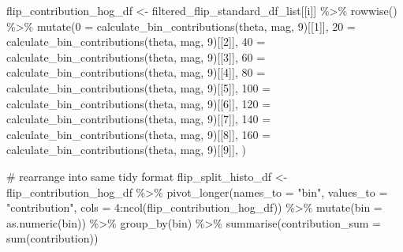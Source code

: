 \documentclass[
  letterpaper,
  DIV=11,
  numbers=noendperiod]{scrreprt}
\newenvironment{Shaded}{\begin{snugshade}}{\end{snugshade}}
\newcommand{\AttributeTok}[1]{\textcolor[rgb]{0.40,0.45,0.13}{#1}}
\newcommand{\CommentTok}[1]{\textcolor[rgb]{0.37,0.37,0.37}{#1}}
\newcommand{\DecValTok}[1]{\textcolor[rgb]{0.68,0.00,0.00}{#1}}
\newcommand{\FunctionTok}[1]{\textcolor[rgb]{0.28,0.35,0.67}{#1}}
\newcommand{\NormalTok}[1]{\textcolor[rgb]{0.00,0.23,0.31}{#1}}
\newcommand{\OtherTok}[1]{\textcolor[rgb]{0.00,0.23,0.31}{#1}}
\newcommand{\SpecialCharTok}[1]{\textcolor[rgb]{0.37,0.37,0.37}{#1}}
\newcommand{\StringTok}[1]{\textcolor[rgb]{0.13,0.47,0.30}{#1}}
\begin{document}
\begin{Shaded}
\begin{Highlighting}[]
\NormalTok{  flip\_contribution\_hog\_df }\OtherTok{\textless{}{-}}
\NormalTok{    filtered\_flip\_standard\_df\_list[[i]] }\SpecialCharTok{\%\textgreater{}\%}
    \FunctionTok{rowwise}\NormalTok{() }\SpecialCharTok{\%\textgreater{}\%}
    \FunctionTok{mutate}\NormalTok{(}\StringTok{\textasciigrave{}}\AttributeTok{0}\StringTok{\textasciigrave{}} \OtherTok{=} \FunctionTok{calculate\_bin\_contributions}\NormalTok{(theta, mag, }\DecValTok{9}\NormalTok{)[[}\DecValTok{1}\NormalTok{]],}
           \StringTok{\textasciigrave{}}\AttributeTok{20}\StringTok{\textasciigrave{}} \OtherTok{=} \FunctionTok{calculate\_bin\_contributions}\NormalTok{(theta, mag, }\DecValTok{9}\NormalTok{)[[}\DecValTok{2}\NormalTok{]],}
           \StringTok{\textasciigrave{}}\AttributeTok{40}\StringTok{\textasciigrave{}} \OtherTok{=} \FunctionTok{calculate\_bin\_contributions}\NormalTok{(theta, mag, }\DecValTok{9}\NormalTok{)[[}\DecValTok{3}\NormalTok{]],}
           \StringTok{\textasciigrave{}}\AttributeTok{60}\StringTok{\textasciigrave{}} \OtherTok{=} \FunctionTok{calculate\_bin\_contributions}\NormalTok{(theta, mag, }\DecValTok{9}\NormalTok{)[[}\DecValTok{4}\NormalTok{]],}
           \StringTok{\textasciigrave{}}\AttributeTok{80}\StringTok{\textasciigrave{}} \OtherTok{=} \FunctionTok{calculate\_bin\_contributions}\NormalTok{(theta, mag, }\DecValTok{9}\NormalTok{)[[}\DecValTok{5}\NormalTok{]],}
           \StringTok{\textasciigrave{}}\AttributeTok{100}\StringTok{\textasciigrave{}} \OtherTok{=} \FunctionTok{calculate\_bin\_contributions}\NormalTok{(theta, mag, }\DecValTok{9}\NormalTok{)[[}\DecValTok{6}\NormalTok{]],}
           \StringTok{\textasciigrave{}}\AttributeTok{120}\StringTok{\textasciigrave{}} \OtherTok{=} \FunctionTok{calculate\_bin\_contributions}\NormalTok{(theta, mag, }\DecValTok{9}\NormalTok{)[[}\DecValTok{7}\NormalTok{]],}
           \StringTok{\textasciigrave{}}\AttributeTok{140}\StringTok{\textasciigrave{}} \OtherTok{=} \FunctionTok{calculate\_bin\_contributions}\NormalTok{(theta, mag, }\DecValTok{9}\NormalTok{)[[}\DecValTok{8}\NormalTok{]],}
           \StringTok{\textasciigrave{}}\AttributeTok{160}\StringTok{\textasciigrave{}} \OtherTok{=} \FunctionTok{calculate\_bin\_contributions}\NormalTok{(theta, mag, }\DecValTok{9}\NormalTok{)[[}\DecValTok{9}\NormalTok{]],}
\NormalTok{           )}
  
  \CommentTok{\# rearrange into same tidy format}
\NormalTok{  flip\_split\_histo\_df }\OtherTok{\textless{}{-}}
\NormalTok{    flip\_contribution\_hog\_df }\SpecialCharTok{\%\textgreater{}\%}
    \FunctionTok{pivot\_longer}\NormalTok{(}\AttributeTok{names\_to =} \StringTok{"bin"}\NormalTok{,}
                 \AttributeTok{values\_to =} \StringTok{"contribution"}\NormalTok{,}
                 \AttributeTok{cols =} \DecValTok{4}\SpecialCharTok{:}\FunctionTok{ncol}\NormalTok{(flip\_contribution\_hog\_df)) }\SpecialCharTok{\%\textgreater{}\%}
    \FunctionTok{mutate}\NormalTok{(}\AttributeTok{bin =} \FunctionTok{as.numeric}\NormalTok{(bin)) }\SpecialCharTok{\%\textgreater{}\%}
    \FunctionTok{group\_by}\NormalTok{(bin) }\SpecialCharTok{\%\textgreater{}\%}
    \FunctionTok{summarise}\NormalTok{(}\AttributeTok{contribution\_sum =} \FunctionTok{sum}\NormalTok{(contribution))}


\end{Highlighting}
\end{Shaded}
\end{document}
